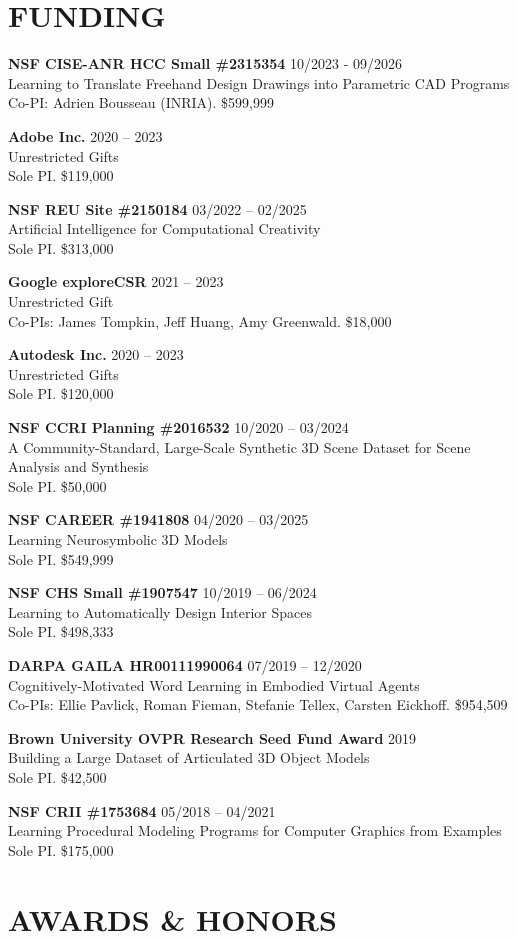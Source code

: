 \documentclass[line,margin]{res}
\begin{document}
\begin{resume}

\section{FUNDING}

\newcommand{\funding}[5] {
	\textbf{#1} \hfill #5\\
	#2 \\
	#3. #4
}

\funding
{NSF CISE-ANR HCC Small \#2315354}
{Learning to Translate Freehand Design Drawings into Parametric CAD Programs}
{Co-PI: Adrien Bousseau (INRIA)}
{\$599,999}
{10/2023 - 09/2026}

\funding
{Adobe Inc.}
{Unrestricted Gifts}
{Sole PI}
{\$119,000}
{2020 -- 2023}

\funding
{NSF REU Site \#2150184}
{Artificial Intelligence for Computational Creativity}
{Sole PI}
{\$313,000}
{03/2022 -- 02/2025}

\funding
{Google exploreCSR}
{Unrestricted Gift}
{Co-PIs: James Tompkin, Jeff Huang, Amy Greenwald}
{\$18,000}
{2021 -- 2023}

\funding
{Autodesk Inc.}
{Unrestricted Gifts}
{Sole PI}
{\$120,000}
{2020 -- 2023}

\funding
{NSF CCRI Planning \#2016532}
{A Community-Standard, Large-Scale Synthetic 3D Scene Dataset for Scene Analysis and Synthesis}
{Sole PI}
{\$50,000}
{10/2020 -- 03/2024}

\funding
{NSF CAREER \#1941808}
{Learning Neurosymbolic 3D Models}
{Sole PI}
{\$549,999}
{04/2020 -- 03/2025}

\funding
{NSF CHS Small \#1907547}
{Learning to Automatically Design Interior Spaces}
{Sole PI}
{\$498,333}
{10/2019 -- 06/2024}

\funding
{DARPA GAILA HR00111990064}
{Cognitively-Motivated Word Learning in Embodied Virtual Agents}
{Co-PIs: Ellie Pavlick, Roman Fieman, Stefanie Tellex, Carsten Eickhoff}
{\$954,509}
{07/2019 -- 12/2020}

\funding
{Brown University OVPR Research Seed Fund Award}
{Building a Large Dataset of Articulated 3D Object Models}
{Sole PI}
{\$42,500}
{2019}

\funding
{NSF CRII \#1753684}
{Learning Procedural Modeling Programs for Computer Graphics from Examples}
{Sole PI}
{\$175,000}
{05/2018 -- 04/2021}


\section{AWARDS \& HONORS}


\end{resume}
\end{document}
